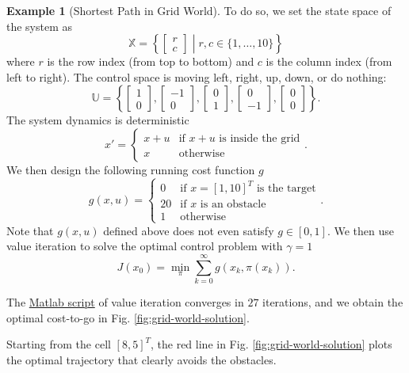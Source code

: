 \documentclass[
]{book}
\theoremstyle{definition}
\theoremstyle{definition}
\newtheorem{example}{Example}[chapter]
\theoremstyle{definition}
\theoremstyle{definition}
\theoremstyle{remark}
\begin{document}
\begin{example}[Shortest Path in Grid World]
To do so, we set the state space of the system as
\[
\mathbb{X} = \left\{ \begin{bmatrix} r \\ c \end{bmatrix} \middle\vert r,c \in \{ 1,\dots,10 \} \right\}
\]
where \(r\) is the row index (from top to bottom) and \(c\) is the column index (from left to right). The control space is moving left, right, up, down, or do nothing:
\[
\mathbb{U} = \left\{ 
    \begin{bmatrix} 1 \\ 0 \end{bmatrix},
    \begin{bmatrix} -1 \\ 0 \end{bmatrix},
    \begin{bmatrix} 0 \\ 1 \end{bmatrix},
    \begin{bmatrix} 0 \\ -1 \end{bmatrix},
    \begin{bmatrix} 0 \\ 0 \end{bmatrix}
    \right\}.
\]
The system dynamics is deterministic
\[
x' = \begin{cases}
x + u & \text{if } x + u \text{ is inside the grid} \\
x & \text{otherwise}
\end{cases}.
\]
We then design the following running cost function \(g\)
\[
g(x,u) = \begin{cases}
0 & \text{if } x = [1,10]^T \text{ is the target} \\
20 & \text{if } x \text{ is an obstacle} \\
1 & \text{otherwise}
\end{cases}.
\]
Note that \(g(x,u)\) defined above does not even satisfy \(g \in [0,1]\). We then use value iteration to solve the optimal control problem with \(\gamma = 1\)
\[
J(x_0) = \min_{\pi} \sum_{k=0}^{\infty} g(x_k,\pi(x_k)).
\]

The \href{https://github.com/ComputationalRobotics/OptimalControlEstimation-Examples/blob/main/grid_world_value_iteration.m}{Matlab script} of value iteration converges in \(27\) iterations, and we obtain the optimal cost-to-go in Fig. \ref{fig:grid-world-solution}.

Starting from the cell \([8,5]^T\), the red line in Fig. \ref{fig:grid-world-solution} plots the optimal trajectory that clearly avoids the obstacles.


\end{example}
\end{document}

